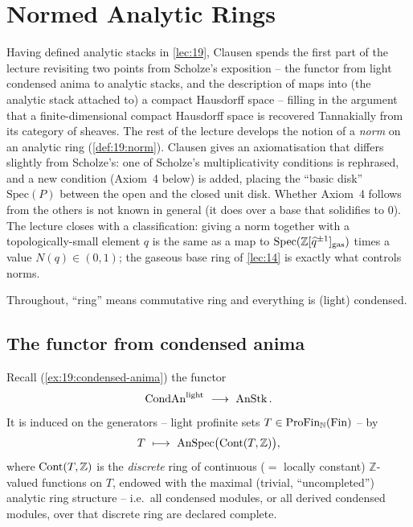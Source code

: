 \section{Normed Analytic Rings}
\label{lec:20}

Having defined analytic stacks in \cref{lec:19}, Clausen spends the first part
of the lecture revisiting two points from Scholze's exposition -- the functor
from light condensed anima to analytic stacks, and the description of maps into
(the analytic stack attached to) a compact Hausdorff space -- filling in the
argument that a finite-dimensional compact Hausdorff space is recovered
Tannakially from its category of sheaves. The rest of the lecture develops the
notion of a \emph{norm} on an analytic ring (\cref{def:19:norm}). Clausen gives
an axiomatisation that differs slightly from Scholze's: one of Scholze's
multiplicativity conditions is rephrased, and a new condition (Axiom~4 below)
is added, placing the ``basic disk'' $\mathrm{Spec}(P)$ between the open and the
closed unit disk. Whether Axiom~4 follows from the others is not known in
general (it does over a base that solidifies to $0$). The lecture closes with a
classification: giving a norm together with a topologically-small element $q$ is
the same as a map to $\mathrm{Spec}(\mathbb{Z}[\widehat q^{\pm1}]_{\mathrm{gas}})$ times a
value $N(q)\in(0,1)$; the gaseous base ring of \cref{lec:14} is exactly what
controls norms.

Throughout, ``ring'' means commutative ring and everything is (light)
condensed.

\subsection{The functor from condensed anima}
\label{subsec:20:condensed-anima}

Recall (\cref{ex:19:condensed-anima}) the functor
\begin{equation}
\label{eq:20:condan-to-anstk}
\operatorname{CondAn}^{\mathrm{light}}\ \longrightarrow\ \operatorname{AnStk} .
\end{equation}
It is induced on the generators -- light profinite sets $T\in
\mathrm{ProFin}_{\mathbb N}(\mathrm{Fin})$ -- by
\begin{equation}
\label{eq:20:T-to-spec}
T\ \longmapsto\ \operatorname{AnSpec}\bigl(\operatorname{Cont}(T,\mathbb Z)\bigr),
\end{equation}
where $\operatorname{Cont}(T,\mathbb Z)$ is the \emph{discrete} ring of continuous
($=$ locally constant) $\mathbb Z$-valued functions on $T$, endowed with the
maximal (trivial, ``uncompleted'') analytic ring structure -- i.e.\ all
condensed modules, or all derived condensed modules, over that discrete ring are
declared complete.

